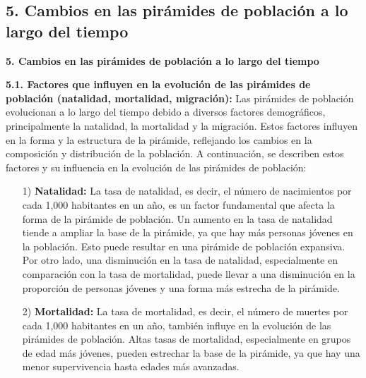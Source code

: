 \documentclass[8pt,a4paper]{beamer}
\begin{document}
{\subsection{5. Cambios en las pirámides de población a lo largo del tiempo}
\begin{frame}{\textbf{5. Cambios en las pirámides de población a lo largo del tiempo}}
\begin{block}{\textbf{5.1. Factores que influyen en la evolución de las pirámides de población (natalidad, mortalidad, migración):}}
\justifying
Las pirámides de población evolucionan a lo largo del tiempo debido a diversos factores demográficos, principalmente la natalidad, la mortalidad y la migración. Estos factores influyen en la forma y la estructura de la pirámide, reflejando los cambios en la composición y distribución de la población. A continuación, se describen estos factores y su influencia en la evolución de las pirámides de población:
\begin{enumerate}
\justifying
\item[1)] \textbf{Natalidad:} La tasa de natalidad, es decir, el número de nacimientos por cada 1,000 habitantes en un año, es un factor fundamental que afecta la forma de la pirámide de población. Un aumento en la tasa de natalidad tiende a ampliar la base de la pirámide, ya que hay más personas jóvenes en la población. Esto puede resultar en una pirámide de población expansiva. Por otro lado, una disminución en la tasa de natalidad, especialmente en comparación con la tasa de mortalidad, puede llevar a una disminución en la proporción de personas jóvenes y una forma más estrecha de la pirámide.

\item[2)] \textbf{Mortalidad:} La tasa de mortalidad, es decir, el número de muertes por cada 1,000 habitantes en un año, también influye en la evolución de las pirámides de población. Altas tasas de mortalidad, especialmente en grupos de edad más jóvenes, pueden estrechar la base de la pirámide, ya que hay una menor supervivencia hasta edades más avanzadas.
\end{enumerate}
\end{block}
\end{frame}

}
\end{document}
